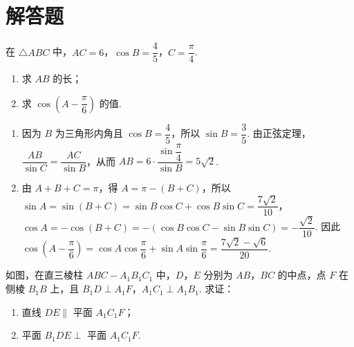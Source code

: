 \section{解答题}

\begin{problem}
在 \(\triangle ABC\) 中，\(AC=6\)，\(\cos B=\dfrac45\)，\(C=\dfrac\pi4\).

\begin{enumerate}
\item 求 \(AB\) 的长；
\item 求 \(\cos\left(A-\dfrac\pi6\right)\) 的值.
\end{enumerate}
\end{problem}

\begin{solution}
\begin{enumerate}
\item 因为 \(B\) 为三角形内角且 \(\cos B=\dfrac45\)，所以 \(\sin B=\dfrac35\). 由正弦定理，\(\dfrac{AB}{\sin C}=\dfrac{AC}{\sin B}\)，从而 \(AB=6\cdot\dfrac{\sin\dfrac\pi4}{\sin B}=5\sqrt2\).
\item 由 \(A+B+C=\pi\)，得 \(A=\pi-(B+C)\)，所以 \(\sin A=\sin(B+C)=\sin B\cos C+\cos B\sin C=\dfrac{7\sqrt2}{10}\)，\(\cos A=-\cos(B+C)=-\left(\cos B\cos C-\sin B\sin C\right)=-\dfrac{\sqrt2}{10}\). 因此 \(\cos\left(A-\dfrac\pi6\right)=\cos A\cos\dfrac\pi6+\sin A\sin\dfrac\pi6=\dfrac{7\sqrt2-\sqrt6}{20}\).
\end{enumerate}
\end{solution}

\begin{problem}
如图，在直三棱柱 \(ABC-A_1B_1C_1\) 中，\(D\)，\(E\) 分别为 \(AB\)，\(BC\) 的中点，点 \(F\) 在侧棱 \(B_1B\) 上，且 \(B_1D\perp A_1F\)，\(A_1C_1\perp A_1B_1\). 求证：

\begin{enumerate}
\item 直线 \(DE\parallel\) 平面 \(A_1C_1F\)；
\item 平面 \(B_1DE\perp\) 平面 \(A_1C_1F\).
\end{enumerate}

\end{problem}


